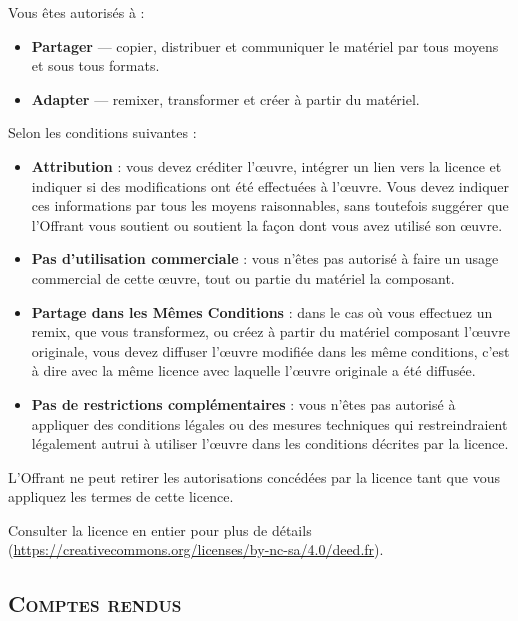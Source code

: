 \documentclass{article}
\begin{document}
\medskip

Vous êtes autorisés à :

\begin{itemize}
	\item \textbf{Partager} --- copier, distribuer et communiquer le matériel par tous moyens et sous tous formats.
	\item \textbf{Adapter} --- remixer, transformer et créer à partir du matériel.
\end{itemize}

\bigskip

Selon les conditions suivantes :

\begin{itemize}
	\item \textbf{Attribution} : vous devez créditer l'\oe{}uvre, intégrer un lien vers la licence et indiquer si des modifications ont été effectuées à l'\oe{}uvre. Vous devez indiquer ces informations par tous les moyens raisonnables, sans toutefois suggérer que l'Offrant vous soutient ou soutient la façon dont vous avez utilisé son \oe{}uvre. 
	\item \textbf{Pas d'utilisation commerciale} : vous n'êtes pas autorisé à faire un usage commercial de cette \oe{}uvre, tout ou partie du matériel la composant. 
	\item \textbf{Partage dans les Mêmes Conditions} : dans le cas où vous effectuez un remix, que vous transformez, ou créez à partir du matériel composant l'\oe{}uvre originale, vous devez diffuser l'\oe{}uvre modifiée dans les même conditions, c'est à dire avec la même licence avec laquelle l'\oe{}uvre originale a été diffusée.
	\item \textbf{Pas de restrictions complémentaires} : vous n'êtes pas autorisé à appliquer des conditions légales ou des mesures techniques qui restreindraient légalement autrui à utiliser l'\oe{}uvre dans les conditions décrites par la licence. 
\end{itemize}

\bigskip

L'Offrant ne peut retirer les autorisations concédées par la licence tant que vous appliquez les termes de cette licence.

\bigskip

Consulter la licence en entier pour plus de détails (\url{https://creativecommons.org/licenses/by-nc-sa/4.0/deed.fr}).



\newpage

\nocite{*}

\begin{center}
	\section*{\textsc{Comptes rendus}}
\end{center}

\bigskip

\printbibheading[heading=none]
\bibbycategory

\end{document}
